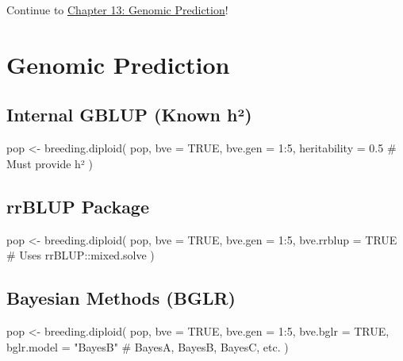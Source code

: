 \documentclass[
  letterpaper,
]{book}
\newenvironment{Shaded}{\begin{snugshade}}{\end{snugshade}}
\newcommand{\AttributeTok}[1]{\textcolor[rgb]{0.40,0.45,0.13}{#1}}
\newcommand{\CommentTok}[1]{\textcolor[rgb]{0.37,0.37,0.37}{#1}}
\newcommand{\ConstantTok}[1]{\textcolor[rgb]{0.56,0.35,0.01}{#1}}
\newcommand{\DecValTok}[1]{\textcolor[rgb]{0.68,0.00,0.00}{#1}}
\newcommand{\FloatTok}[1]{\textcolor[rgb]{0.68,0.00,0.00}{#1}}
\newcommand{\FunctionTok}[1]{\textcolor[rgb]{0.28,0.35,0.67}{#1}}
\newcommand{\NormalTok}[1]{\textcolor[rgb]{0.00,0.23,0.31}{#1}}
\newcommand{\OtherTok}[1]{\textcolor[rgb]{0.00,0.23,0.31}{#1}}
\newcommand{\SpecialCharTok}[1]{\textcolor[rgb]{0.37,0.37,0.37}{#1}}
\newcommand{\StringTok}[1]{\textcolor[rgb]{0.13,0.47,0.30}{#1}}
\begin{document}
Continue to \href{13-genomic-prediction.qmd}{Chapter 13: Genomic
Prediction}!

\chapter{Genomic Prediction}\label{sec-genomic-prediction}

\section{Internal GBLUP (Known h²)}\label{internal-gblup-known-huxb2}

\begin{Shaded}
\begin{Highlighting}[]
\NormalTok{pop }\OtherTok{\textless{}{-}} \FunctionTok{breeding.diploid}\NormalTok{(}
\NormalTok{  pop,}
  \AttributeTok{bve =} \ConstantTok{TRUE}\NormalTok{,}
  \AttributeTok{bve.gen =} \DecValTok{1}\SpecialCharTok{:}\DecValTok{5}\NormalTok{,}
  \AttributeTok{heritability =} \FloatTok{0.5}     \CommentTok{\# Must provide h²}
\NormalTok{)}
\end{Highlighting}
\end{Shaded}

\section{rrBLUP Package}\label{rrblup-package}

\begin{Shaded}
\begin{Highlighting}[]
\NormalTok{pop }\OtherTok{\textless{}{-}} \FunctionTok{breeding.diploid}\NormalTok{(}
\NormalTok{  pop,}
  \AttributeTok{bve =} \ConstantTok{TRUE}\NormalTok{,}
  \AttributeTok{bve.gen =} \DecValTok{1}\SpecialCharTok{:}\DecValTok{5}\NormalTok{,}
  \AttributeTok{bve.rrblup =} \ConstantTok{TRUE}     \CommentTok{\# Uses rrBLUP::mixed.solve}
\NormalTok{)}
\end{Highlighting}
\end{Shaded}

\section{Bayesian Methods (BGLR)}\label{bayesian-methods-bglr}

\begin{Shaded}
\begin{Highlighting}[]
\NormalTok{pop }\OtherTok{\textless{}{-}} \FunctionTok{breeding.diploid}\NormalTok{(}
\NormalTok{  pop,}
  \AttributeTok{bve =} \ConstantTok{TRUE}\NormalTok{,}
  \AttributeTok{bve.gen =} \DecValTok{1}\SpecialCharTok{:}\DecValTok{5}\NormalTok{,}
  \AttributeTok{bve.bglr =} \ConstantTok{TRUE}\NormalTok{,}
  \AttributeTok{bglr.model =} \StringTok{"BayesB"}   \CommentTok{\# BayesA, BayesB, BayesC, etc.}
\NormalTok{)}
\end{Highlighting}
\end{Shaded}
\end{document}
